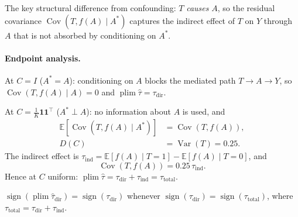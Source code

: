 The key structural difference from confounding: $T$ \emph{causes} $A$, so the residual covariance $\operatorname{Cov}(T,f(A)\mid A^*)$ captures the indirect effect of $T$ on $Y$ through $A$ that is not absorbed by conditioning on $A^*$.

\paragraph{Endpoint analysis.}

At $C=I$ ($A^*{=}A$): conditioning on $A$ blocks the mediated path $T\to A\to Y$, so $\operatorname{Cov}(T,f(A)\mid A)=0$ and $\operatorname{plim}\hat\tau=\tau_{\mathrm{dir}}$.

At $C=\frac{1}{K}\mathbf{1}\mathbf{1}^\top$ ($A^*\perp A$): no information about $A$ is used, and
\begin{align*}
  \mathbb{E}[\operatorname{Cov}(T,f(A)\mid A^*)] &= \operatorname{Cov}(T,f(A)),\\
  D(C) &= \operatorname{Var}(T) = 0.25.
\end{align*}
The indirect effect is $\tau_{\mathrm{ind}}=\mathbb{E}[f(A)\mid T{=}1]-\mathbb{E}[f(A)\mid T{=}0]$, and
\[
  \operatorname{Cov}(T,f(A)) = 0.25\,\tau_{\mathrm{ind}}.
\]
Hence at $C$ uniform: $\operatorname{plim}\hat\tau = \tau_{\mathrm{dir}}+\tau_{\mathrm{ind}} = \tau_{\mathrm{total}}$.

\begin{proposition}
\label{prop:med_sign}
$\operatorname{sign}(\operatorname{plim}\hat\tau_{\mathrm{dir}})=\operatorname{sign}(\tau_{\mathrm{dir}})$ whenever $\operatorname{sign}(\tau_{\mathrm{dir}})=\operatorname{sign}(\tau_{\mathrm{total}})$, where $\tau_{\mathrm{total}}=\tau_{\mathrm{dir}}+\tau_{\mathrm{ind}}$.
\end{proposition}

